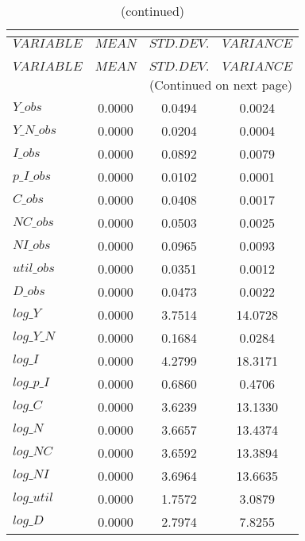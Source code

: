  
\begin{center}
\begin{longtable}{lccc} 
\caption{THEORETICAL MOMENTS}\\
 \label{Table:th_moments}\\
\toprule 
$VARIABLE   $	 & 	 $         MEAN$	 & 	 $    STD. DEV.$	 & 	 $     VARIANCE$\\
\midrule \endfirsthead 
\caption{(continued)}\\
 \toprule \\ 
$VARIABLE   $	 & 	 $         MEAN$	 & 	 $    STD. DEV.$	 & 	 $     VARIANCE$\\
\midrule \endhead 
\midrule \multicolumn{4}{r}{(Continued on next page)} \\ \bottomrule \endfoot 
\bottomrule \endlastfoot 
$Y\_obs     $	 & 	       0.0000	 & 	       0.0494	 & 	       0.0024 \\ 
$Y\_N\_obs  $	 & 	       0.0000	 & 	       0.0204	 & 	       0.0004 \\ 
$I\_obs     $	 & 	       0.0000	 & 	       0.0892	 & 	       0.0079 \\ 
$p\_I\_obs  $	 & 	       0.0000	 & 	       0.0102	 & 	       0.0001 \\ 
$C\_obs     $	 & 	       0.0000	 & 	       0.0408	 & 	       0.0017 \\ 
$NC\_obs    $	 & 	       0.0000	 & 	       0.0503	 & 	       0.0025 \\ 
$NI\_obs    $	 & 	       0.0000	 & 	       0.0965	 & 	       0.0093 \\ 
$util\_obs  $	 & 	       0.0000	 & 	       0.0351	 & 	       0.0012 \\ 
$D\_obs     $	 & 	       0.0000	 & 	       0.0473	 & 	       0.0022 \\ 
$log\_Y     $	 & 	       0.0000	 & 	       3.7514	 & 	      14.0728 \\ 
$log\_Y\_N  $	 & 	       0.0000	 & 	       0.1684	 & 	       0.0284 \\ 
$log\_I     $	 & 	       0.0000	 & 	       4.2799	 & 	      18.3171 \\ 
$log\_p\_I  $	 & 	       0.0000	 & 	       0.6860	 & 	       0.4706 \\ 
$log\_C     $	 & 	       0.0000	 & 	       3.6239	 & 	      13.1330 \\ 
$log\_N     $	 & 	       0.0000	 & 	       3.6657	 & 	      13.4374 \\ 
$log\_NC    $	 & 	       0.0000	 & 	       3.6592	 & 	      13.3894 \\ 
$log\_NI    $	 & 	       0.0000	 & 	       3.6964	 & 	      13.6635 \\ 
$log\_util  $	 & 	       0.0000	 & 	       1.7572	 & 	       3.0879 \\ 
$log\_D     $	 & 	       0.0000	 & 	       2.7974	 & 	       7.8255 \\ 
\end{longtable}
 \end{center}
